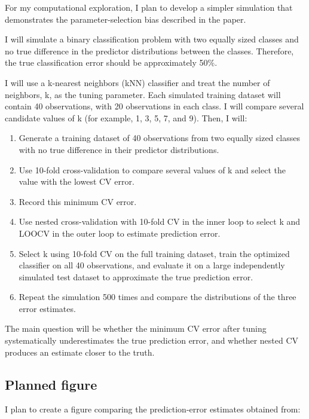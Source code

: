 \documentclass[
  letterpaper,
  DIV=11,
  numbers=noendperiod]{scrreprt}
\providecommand{\tightlist}{%
  \setlength{\itemsep}{0pt}\setlength{\parskip}{0pt}}
\begin{document}
For my computational exploration, I plan to develop a simpler simulation
that demonstrates the parameter-selection bias described in the paper.

I will simulate a binary classification problem with two equally sized
classes and no true difference in the predictor distributions between
the classes. Therefore, the true classification error should be
approximately 50\%.

I will use a k-nearest neighbors (kNN) classifier and treat the number
of neighbors, k, as the tuning parameter. Each simulated training
dataset will contain 40 observations, with 20 observations in each
class. I will compare several candidate values of k (for example, 1, 3,
5, 7, and 9). Then, I will:

\begin{enumerate}
\def\labelenumi{\arabic{enumi}.}
\tightlist
\item
  Generate a training dataset of 40 observations from two equally sized
  classes with no true difference in their predictor distributions.
\item
  Use 10-fold cross-validation to compare several values of k and select
  the value with the lowest CV error.
\item
  Record this minimum CV error.
\item
  Use nested cross-validation with 10-fold CV in the inner loop to
  select k and LOOCV in the outer loop to estimate prediction error.
\item
  Select k using 10-fold CV on the full training dataset, train the
  optimized classifier on all 40 observations, and evaluate it on a
  large independently simulated test dataset to approximate the true
  prediction error.
\item
  Repeat the simulation 500 times and compare the distributions of the
  three error estimates.
\end{enumerate}

The main question will be whether the minimum CV error after tuning
systematically underestimates the true prediction error, and whether
nested CV produces an estimate closer to the truth.

\subsection{Planned figure}\label{planned-figure}

I plan to create a figure comparing the prediction-error estimates
obtained from:
\end{document}
